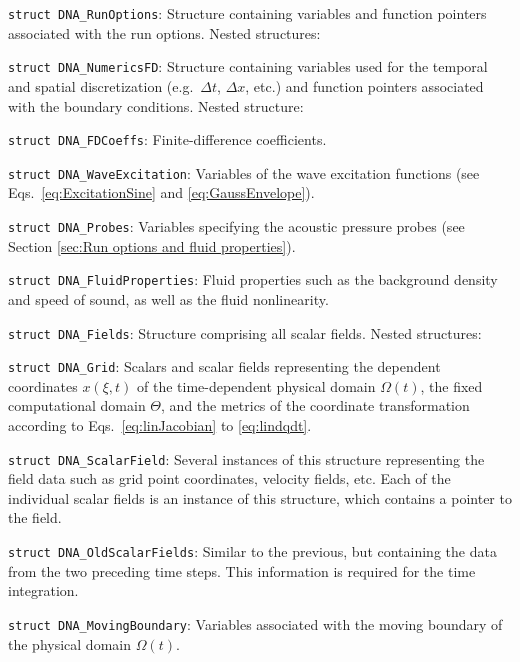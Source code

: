 \begin{compactitem}
\item {\tt struct DNA\_RunOptions}: Structure containing variables and function pointers associated with the run options. Nested structures:
\begin{compactitem}
\item {\tt struct DNA\_NumericsFD}: Structure containing variables used for the temporal and spatial discretization (e.g.~$\Delta t$, $\Delta x$, etc.) and function pointers associated with the boundary conditions. Nested structure: \item {\tt struct DNA\_FDCoeffs}: Finite-difference coefficients.
\item {\tt struct DNA\_WaveExcitation}: Variables of the wave excitation functions (see Eqs.~\eqref{eq:ExcitationSine} and \eqref{eq:GaussEnvelope}).
\item {\tt struct DNA\_Probes}: Variables specifying the acoustic pressure probes (see Section \ref{sec:Run options and fluid properties}).
\end{compactitem}
\item {\tt struct DNA\_FluidProperties}: Fluid properties such as the background density and speed of sound, as well as the fluid nonlinearity.
\item {\tt struct DNA\_Fields}: Structure comprising all scalar fields. Nested structures:
\begin{compactitem}
\item {\tt struct DNA\_Grid}: Scalars and scalar fields representing the dependent coordinates $x\left(\xi,t\right)$ of the time-dependent physical domain $\Omega\left(t\right)$, the fixed computational domain $\Theta$, and the metrics of the coordinate transformation according to Eqs.~\eqref{eq:linJacobian} to \eqref{eq:lindqdt}.
\item {\tt struct DNA\_ScalarField}: Several instances of this structure representing the field data such as grid point coordinates, velocity fields, etc. Each of the individual scalar fields is an instance of this structure, which contains a pointer to the field.
\item {\tt struct DNA\_OldScalarFields}: Similar to the previous, but containing the data from the two preceding time steps. This information is required for the time integration.
\end{compactitem}
\item {\tt struct DNA\_MovingBoundary}: Variables associated with the moving boundary of the physical domain $\Omega\left(t\right)$.
\end{compactitem}



